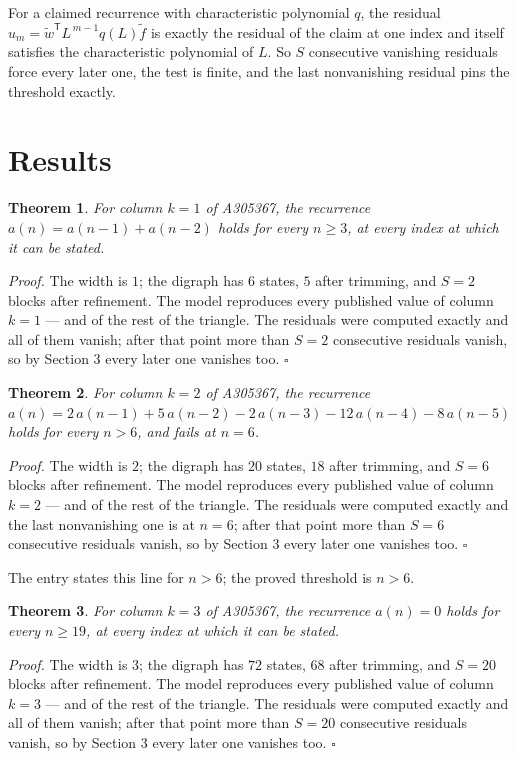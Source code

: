 \documentclass[11pt]{article}
\newtheorem{theorem}{Theorem}
\theoremstyle{definition}
\begin{document}
For a claimed recurrence with characteristic polynomial $q$, the residual $u_m = \tilde w^{\mathsf T}L^{\,m-1}q(L)\tilde f$ is exactly the residual of the claim at one index and itself satisfies the characteristic polynomial of $L$. So $S$ consecutive vanishing residuals force every later one, the test is finite, and the last nonvanishing residual pins the threshold exactly.

\section{Results}

\begin{theorem} For column $k = 1$ of A305367, the recurrence $a(n) = a(n-1) + a(n-2)$ holds for every $n \ge 3$, at every index at which it can be stated.\end{theorem}

{\itshape Proof.} The width is $1$; the digraph has $6$ states, $5$ after trimming, and $S = 2$ blocks after refinement. The model reproduces every published value of column $k = 1$ --- and of the rest of the triangle. The residuals were computed exactly and all of them vanish; after that point more than $S = 2$ consecutive residuals vanish, so by Section 3 every later one vanishes too. $\square$

\begin{theorem} For column $k = 2$ of A305367, the recurrence $a(n) = 2\,a(n-1) + 5\,a(n-2) - 2\,a(n-3) - 12\,a(n-4) - 8\,a(n-5)$ holds for every $n > 6$, and fails at $n = 6$.\end{theorem}

{\itshape Proof.} The width is $2$; the digraph has $20$ states, $18$ after trimming, and $S = 6$ blocks after refinement. The model reproduces every published value of column $k = 2$ --- and of the rest of the triangle. The residuals were computed exactly and the last nonvanishing one is at $n = 6$; after that point more than $S = 6$ consecutive residuals vanish, so by Section 3 every later one vanishes too. $\square$

The entry states this line for $n > 6$; the proved threshold is $n > 6$.

\begin{theorem} For column $k = 3$ of A305367, the recurrence $a(n) = 0$ holds for every $n \ge 19$, at every index at which it can be stated.\end{theorem}

{\itshape Proof.} The width is $3$; the digraph has $72$ states, $68$ after trimming, and $S = 20$ blocks after refinement. The model reproduces every published value of column $k = 3$ --- and of the rest of the triangle. The residuals were computed exactly and all of them vanish; after that point more than $S = 20$ consecutive residuals vanish, so by Section 3 every later one vanishes too. $\square$
\end{document}
